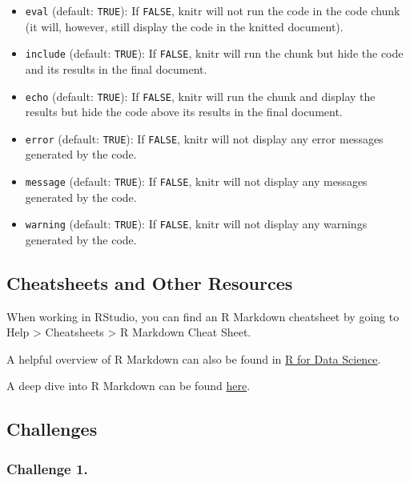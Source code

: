 \documentclass[
]{book}
\providecommand{\tightlist}{%
  \setlength{\itemsep}{0pt}\setlength{\parskip}{0pt}}
\begin{document}
\begin{itemize}
\tightlist
\item
  \texttt{eval} (default: \texttt{TRUE}): If \texttt{FALSE}, knitr will not run the code in the code chunk (it will, however, still display the code in the knitted document).
\item
  \texttt{include} (default: \texttt{TRUE}): If \texttt{FALSE}, knitr will run the chunk but hide the code and its results in the final document.
\item
  \texttt{echo} (default: \texttt{TRUE}): If \texttt{FALSE}, knitr will run the chunk and display the results but hide the code above its results in the final document.
\item
  \texttt{error} (default: \texttt{TRUE}): If \texttt{FALSE}, knitr will not display any error messages generated by the code.
\item
  \texttt{message} (default: \texttt{TRUE}): If \texttt{FALSE}, knitr will not display any messages generated by the code.
\item
  \texttt{warning} (default: \texttt{TRUE}): If \texttt{FALSE}, knitr will not display any warnings generated by the code.
\end{itemize}

\hypertarget{cheatsheets-and-other-resources}{%
\subsection{Cheatsheets and Other Resources}\label{cheatsheets-and-other-resources}}

When working in RStudio, you can find an R Markdown cheatsheet by going to Help \textgreater{} Cheatsheets \textgreater{} R Markdown Cheat Sheet.

A helpful overview of R Markdown can also be found in \href{https://r4ds.had.co.nz/r-markdown.html}{R for Data Science}.

A deep dive into R Markdown can be found \href{https://bookdown.org/yihui/rmarkdown/}{here}.

\hypertarget{challenges}{%
\subsection{Challenges}\label{challenges}}

\hypertarget{challenge-1.}{%
\subsubsection*{Challenge 1.}\label{challenge-1.}}
\end{document}
